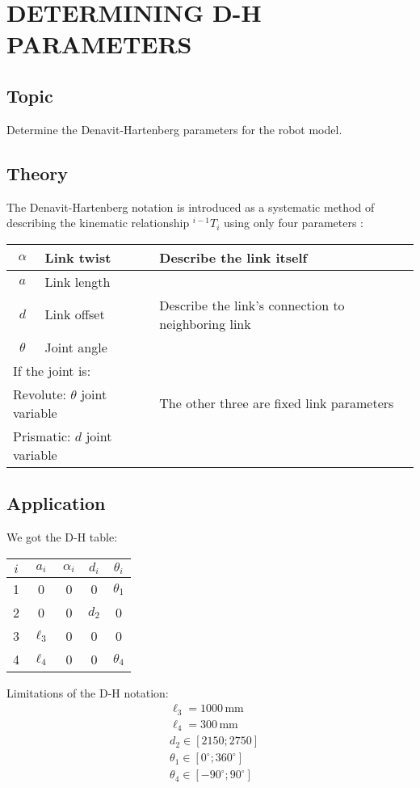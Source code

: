 
\chapter{DETERMINING D-H PARAMETERS}

\section{Topic}
Determine the Denavit-Hartenberg parameters for the robot model.

\section{Theory}
The Denavit-Hartenberg notation is introduced as a systematic method of describing the kinematic relationship ${}^{i-1}T_i$ using only four parameters \cite{1}:

\begin{center}
     \begin{tabular}{|c|l|l|}
          \hline
          $\alpha$ & Link twist & Describe the link itself \\
          \hline
          $a$ & Link length & \\
          \hline
          $d$ & Link offset & Describe the link's connection to neighboring link \\
          \hline
          $\theta$ & Joint angle & \\
          \hline
          \multicolumn{3}{|l|}{If the joint is:} \\
          \hline
          \multicolumn{2}{|l|}{Revolute: $\theta$ joint variable} & The other three are fixed link parameters \\
          \hline
          \multicolumn{2}{|l|}{Prismatic: $d$ joint variable} & \\
          \hline
          \end{tabular}
\end{center}



\section{Application}
We got the D-H table:

\begin{center}
\begin{tabular}{|c|c|c|c|c|}
\hline
$i$ & $a_i$ & $\alpha_i$ & $d_i$ & $\theta_i$ \\
\hline
1 & 0 & 0 & 0 & $\theta_1$ \\
2 & 0 & 0 & $d_2$ & 0 \\
3 & $\ell_3$ & 0 & 0 & 0 \\
4 & $\ell_4$ & 0 & 0 & $\theta_4$ \\
\hline
\end{tabular}
\end{center}


Limitations of the D-H notation:
\begin{align*}
     &\ell_3 = 1000 \,\mathrm{mm}\\
     &\ell_4 = 300 \,\mathrm{mm}\\
     &d_2 \in [2150; 2750] \\
     &\theta_1 \in [0^\circ; 360^\circ] \\
     &\theta_4 \in [-90^\circ; 90^\circ]
\end{align*}

